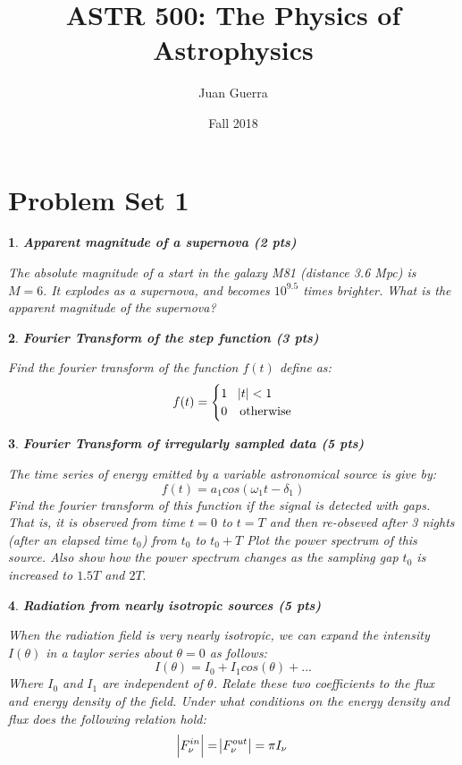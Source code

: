 \documentclass{article}
\title{ASTR 500: The Physics of Astrophysics}
\author{Juan Guerra}
\date{Fall 2018}
\newtheorem{p}{}[section]
\begin{document}
\maketitle

\section{Problem Set 1}
	\begin{p}
		\textbf{Apparent magnitude of a supernova (2 pts)}

		\noindent
		The absolute magnitude of a start in the galaxy M81 (distance 3.6 Mpc) is $M=6.$ It explodes as a supernova, and becomes $10^9.5$ times brighter. What is the apparent magnitude of the supernova?
	\end{p}

	\begin{p}
		\textbf{Fourier Transform of the step function (3 pts)}

		\noindent
		Find the fourier transform  of the function $f(t)$ define as:
		\begin{equation}
		  f(t) =
		  \begin{cases}
		   1 & \abs{t} <1 \\
		   0 & \text{otherwise} \\
		  \end{cases}
		\end{equation}
	\end{p}

	\begin{p}
		\textbf{Fourier Transform of irregularly sampled data (5 pts)}

		\noindent
		The time series of energy emitted by a variable astronomical source is give by:
		\begin{equation}
			f(t)=a_{1}cos(\omega_{1}t -\delta_{1})
		\end{equation}
		Find the fourier transform of this function if the signal is detected with gaps. That is, it is observed from time $t=0$ to $t=T$ and then re-obseved after 3 nights (after an elapsed time $t_{0}$) from $t_{0}$ to $t_{0}+T$ Plot the power spectrum of this source. Also show how the power spectrum changes as the sampling gap $t_{0}$ is increased to $1.5T$ and $2T.$

	\end{p}

	\begin{p}
		\textbf{Radiation from nearly isotropic sources (5 pts)}

		\noindent
		When the radiation field is very nearly isotropic, we can expand the intensity $I(\theta)$ in a taylor series about $\theta =0$ as follows: 
		\begin{equation}
			I(\theta)= I_{0} + I_{1} cos(\theta) + ...
		\end{equation}
		Where $I_{0}$ and $I_{1}$ are independent of $\theta$. Relate these two coefficients to the flux and energy density of the field. Under what conditions on the energy density and flux does the following relation hold:
		\begin{equation}
			\abs{F^{in}_{\nu}} = \abs{F^{out}_{\nu}} = \pi I_{\nu}
		\end{equation}
	\end{p}
\end{document}
